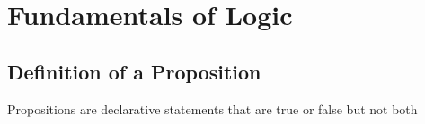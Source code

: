 \documentclass[../../../main.tex]{subfiles}
\begin{document}
\chapter{Fundamentals of Logic}

\section{Definition of a Proposition}

\begin{definition}[Propositions]
Propositions are declarative statements that are true or false but not both
\end{definition}
    
\end{document}
